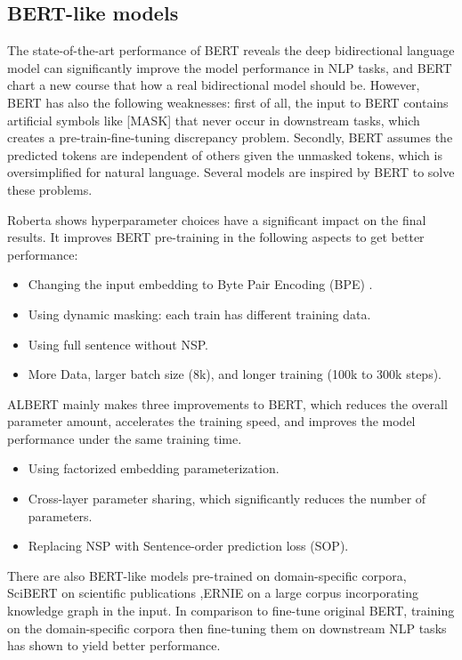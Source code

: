 \documentclass[]{krantz}
\providecommand{\tightlist}{%
  \setlength{\itemsep}{0pt}\setlength{\parskip}{0pt}}
\begin{document}
\hypertarget{bert-like-models}{%
\subsection{BERT-like models}\label{bert-like-models}}

The state-of-the-art performance of BERT reveals the deep bidirectional language model can significantly improve the model performance in NLP tasks, and BERT chart a new course that how a real bidirectional model should be. However, BERT has also the following weaknesses: first of all, the input to BERT contains artificial symbols like {[}MASK{]} that never occur in downstream tasks, which creates a pre-train-fine-tuning discrepancy problem. Secondly, BERT assumes the predicted tokens are independent of others given the unmasked tokens, which is oversimplified for natural language. Several models are inspired by BERT to solve these problems.

Roberta \citet{liu2019roberta} shows hyperparameter choices have a significant impact on the final results. It improves BERT pre-training in the following aspects to get better performance:

\begin{itemize}
\tightlist
\item
  Changing the input embedding to Byte Pair Encoding (BPE) \citet{sennrich2015neural}.
\item
  Using dynamic masking: each train has different training data.
\item
  Using full sentence without NSP.
\item
  More Data, larger batch size (8k), and longer training (100k to 300k steps).
\end{itemize}

ALBERT \citet{lan2019albert} mainly makes three improvements to BERT, which reduces the overall parameter amount, accelerates the training speed, and improves the model performance under the same training time.

\begin{itemize}
\tightlist
\item
  Using factorized embedding parameterization.
\item
  Cross-layer parameter sharing, which significantly reduces the number of parameters.
\item
  Replacing NSP with Sentence-order prediction loss (SOP).
\end{itemize}

There are also BERT-like models pre-trained on domain-specific corpora, SciBERT \citet{beltagy2019scibert} on scientific publications ,ERNIE \citet{zhang2019ernie} on a large corpus incorporating knowledge graph in the input. In comparison to fine-tune original BERT, training on the domain-specific corpora then fine-tuning them on downstream NLP tasks has shown to yield better performance.
\end{document}
